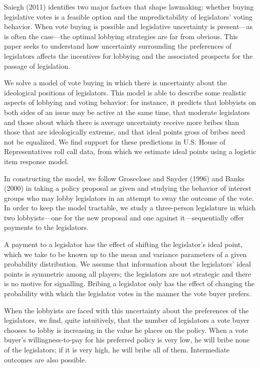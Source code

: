 \documentclass[12pt]{article}
\begin{document}
Saiegh (2011) identifies two major factors that shape lawmaking: whether buying legislative votes is a feasible option and the unpredictability of legislators' voting behavior. When vote buying is possible and legislative uncertainty is present---as is often the case---the optimal lobbying strategies are far from obvious. This paper seeks to understand how uncertainty surrounding the preferences of legislators affects the incentives for lobbying and the associated prospects for the passage of legislation. 

We solve a model of vote buying in which there is uncertainty about the ideological positions of legislators. This model is able to describe some realistic aspects of lobbying and voting behavior: for instance, it predicts that lobbyists on both sides of an issue may be active at the same time, that moderate legislators and those about which there is average uncertainty receive more bribes than those that are ideologically extreme, and that ideal points gross of bribes need not be equalized. We find support for these predictions in U.S. House of Representatives roll call data, from which we estimate ideal points using a logistic item response model.

In constructing the model, we follow Groseclose and Snyder (1996) and Banks (2000) in taking a policy proposal as given and studying the behavior of interest groups who may lobby legislators in an attempt to sway the outcome of the vote. In order to keep the model tractable, we study a three-person legislature in which two lobbyists---one for the new proposal and one against it---sequentially offer payments to the legislators.

A payment to a legislator has the effect of shifting the legislator's ideal point, which we take to be known up to the mean and variance parameters of a given probability distribution. We assume that information about the legislators' ideal points is symmetric among all players; the legislators are not strategic and there is no motive for signalling. Bribing a legislator only has the effect of changing the probability with which the legislator votes in the manner the vote buyer prefers.

When the lobbyists are faced with this uncertainty about the preferences of the legislators, we find, quite intuitively, that the number of legislators a vote buyer chooses to lobby is increasing in the value he places on the policy. When a vote buyer's willingness-to-pay for his preferred policy is very low, he will bribe none of the legislators; if it is very high, he will bribe all of them. Intermediate outcomes are also possible.
\end{document}

